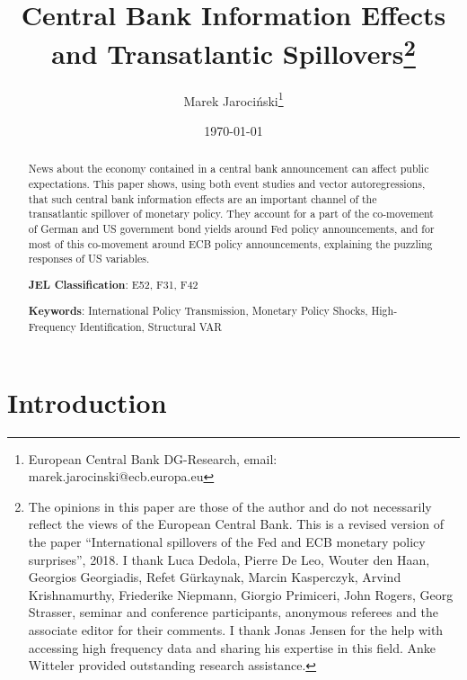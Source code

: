 \documentclass[a4paper,12pt]{article}
\begin{document}

\author{Marek Jaroci\'nski\thanks{%
European Central Bank DG-Research, email: marek.jarocinski@ecb.europa.eu}}
\title{Central Bank Information Effects and Transatlantic Spillovers\thanks{%
The opinions in this paper are
those of the author and do not necessarily reflect the views of the
European Central Bank.
This is a revised version of the paper ``International spillovers of the Fed and ECB monetary policy surprises'', 2018. I thank Luca Dedola, Pierre De Leo, Wouter den Haan, Georgios Georgiadis, Refet G\"urkaynak, Marcin Kasperczyk, Arvind Krishnamurthy, Friederike Niepmann, Giorgio Primiceri, John Rogers, Georg Strasser, seminar and conference participants, anonymous referees and the associate editor for their comments. I thank Jonas Jensen for the help with accessing high frequency data and sharing his expertise in this field. Anke Witteler provided outstanding research assistance.}}
\date{\today}
\maketitle

\begin{abstract}
News about the economy contained in a central bank announcement can affect public expectations. This paper shows, using both event studies and vector autoregressions, that such central bank information effects are an important channel of the transatlantic spillover of monetary policy. They account for a part of the co-movement of German and US government bond yields around Fed policy announcements, and for most of this co-movement around ECB policy announcements, explaining the puzzling responses of US variables.

\bigskip

\noindent \textbf{JEL Classification}: E52, F31, F42

\noindent \textbf{Keywords}: International Policy Transmission, Monetary Policy Shocks, High-Frequency Identification, Structural VAR
\end{abstract}


\pagebreak

\setcounter{page}{1}

\section{Introduction}
\end{document}
